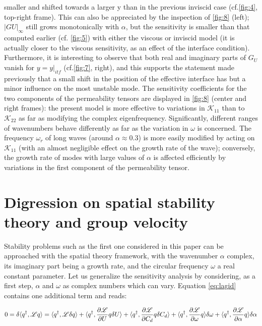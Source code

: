 smaller and shifted towards a larger y than in the previous inviscid case (cf.\ref{fig:4}, top-right frame).
This can also be appreciated by the inspection of \ref{fig:8} (left); $|G U |_{\infty}$ still grows monotonically with
$\alpha$, but the sensitivity is smaller than that computed earlier (cf. \ref{fig:5}) with either the viscous or
inviscid model (it is actually closer to the viscous sensitivity, as an effect of the interface condition).
Furthermore, it is interesting to observe that both real and imaginary parts of $G_U$ vanish for $y = y|_{itf}$
(cf.\ref{fig:7}, right), and this supports the statement made previously that a small shift in the position
of the effective interface has but a minor influence on the most unstable mode.
The sensitivity coefficients for the two components of the permeability tensors are displayed in
\ref{fig:8} (center and right frames): the present model is more effective to variations in $\mathcal{K}_{11}$ than to $\mathcal{K}_{22}$
as far as modifying the complex eigenfrequency. Significantly, different ranges of wavenumbers
behave differently as far as the variation in $\omega$ is concerned. The frequency $\omega_r$ of long waves (around
$\alpha \approx 0.3$) is more easily modified by acting on $\mathcal{K}_{11}$ (with an almost negligible effect on the growth
rate of the wave); conversely, the growth rate of modes with large values of $\alpha$ is affected efficiently
by variations in the first component of the permeability tensor.


\section*{Digression on spatial stability theory and group velocity}

Stability problems such as the first one considered in this paper can be approached with the
spatial theory framework, with the wavenumber $\alpha$ complex, its imaginary part being a growth rate,
and the circular frequency $\omega$ a real constant parameter. Let us generalize the sensitivity analysis by
considering, as a first step, $\alpha$ and $\omega$ as complex numbers which can vary. Equation \ref{eq:lagid} contains one
additional term and reads:

\begin{equation}
0 = \delta \langle q^{\dagger}, \mathscr{L} q \rangle = 
\langle q^{\dagger}, \mathscr{L} \delta q \rangle +
\langle q^{\dagger}, \dfrac{\partial \mathscr{L}}{\partial U}  q \delta U\rangle +
\langle q^{\dagger}, \dfrac{\partial \mathscr{L}}{\partial C_d}  q \delta C_d\rangle +
\langle q^{\dagger}, \dfrac{\partial \mathscr{L}}{\partial \omega}  q \rangle \delta \omega +
\langle q^{\dagger}, \dfrac{\partial \mathscr{L}}{\partial \alpha}  q \rangle \delta \alpha
\label{eq:lagid_spatial}
\end{equation}

